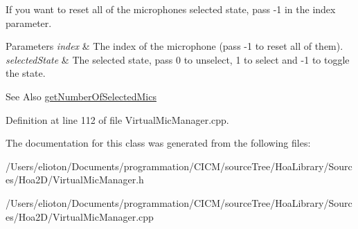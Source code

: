 If you want to reset all of the microphones selected state, pass -\/1 in the index parameter.


\begin{DoxyParams}{Parameters}
{\em index} & The index of the microphone (pass -\/1 to reset all of them). \\
\hline
{\em selected\-State} & The selected state, pass 0 to unselect, 1 to select and -\/1 to toggle the state. \\
\hline
\end{DoxyParams}
\begin{DoxySeeAlso}{See Also}
\hyperlink{class_hoa2_d_1_1_virtual_mic_manager_ad410ea735c2d90d55d7e438d3527ef57}{get\-Number\-Of\-Selected\-Mics} 
\end{DoxySeeAlso}


Definition at line 112 of file Virtual\-Mic\-Manager.\-cpp.



The documentation for this class was generated from the following files\-:\begin{DoxyCompactItemize}
\item 
/\-Users/elioton/\-Documents/programmation/\-C\-I\-C\-M/source\-Tree/\-Hoa\-Library/\-Sources/\-Hoa2\-D/Virtual\-Mic\-Manager.\-h\item 
/\-Users/elioton/\-Documents/programmation/\-C\-I\-C\-M/source\-Tree/\-Hoa\-Library/\-Sources/\-Hoa2\-D/Virtual\-Mic\-Manager.\-cpp\end{DoxyCompactItemize}
